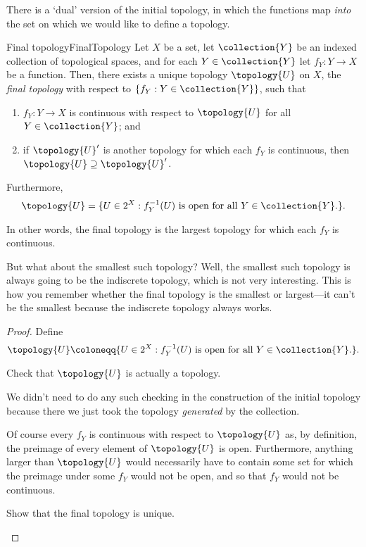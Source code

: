 There is a `dual' version of the initial topology, in which the functions map \emph{into} the set on which we would like to define a topology.
\begin{prp}{Final topology}{FinalTopology}
Let $X$ be a set, let $\collection{Y}$ be an indexed collection of topological spaces, and for each $Y\in \collection{Y}$ let $f_Y:Y\rightarrow X$ be a function.  Then, there exists a unique topology $\topology{U}$ on $X$, the \emph{final topology} with respect to $\{ f_Y:Y\in \collection{Y}\}$, such that
\begin{enumerate}
\item $f_Y:Y\rightarrow X$ is continuous with respect to $\topology{U}$ for all $Y\in \collection{Y}$; and
\item if $\topology{U}'$ is another topology for which each $f_Y$ is continuous, then $\topology{U}\supseteq \topology{U}'$.
\end{enumerate}
Furthermore,
\begin{equation}\label{eqn3.4.27}
\topology{U}=\{ U\in 2^X:f_Y^{-1}(U)\text{ is open for all }Y\in \collection{Y}\text{.}\} .
\end{equation}
\begin{rmk}
In other words, the final topology is the largest topology for which each $f_Y$ is continuous.
\end{rmk}
\begin{rmk}
But what about the smallest such topology?  Well, the smallest such topology is always going to be the indiscrete topology, which is not very interesting.  This is how you remember whether the final topology is the smallest or largest---it can't be the smallest because the indiscrete topology always works.
\end{rmk}
\begin{proof}
Define
\begin{equation}\label{3.4.9}
\topology{U}\coloneqq \{ U\in 2^X:f_Y^{-1}(U)\text{ is open for all }Y\in \collection{Y}\text{.}\} .
\end{equation}
\begin{exr}[breakable=false]{}{}
Check that $\topology{U}$ is actually a topology.
\begin{rmk}
We didn't need to do any such checking in the construction of the initial topology because there we just took the topology \emph{generated} by the collection.
\end{rmk}
\end{exr}
Of course every $f_Y$ is continuous with respect to $\topology{U}$ as, by definition, the preimage of every element of $\topology{U}$ is open.  Furthermore, anything larger than $\topology{U}$ would necessarily have to contain some set for which the preimage under some $f_Y$ would not be open, and so that $f_Y$ would not be continuous.
\begin{exr}[breakable=false]{}{}
Show that the final topology is unique.
\end{exr}
\end{proof}
\end{prp}
